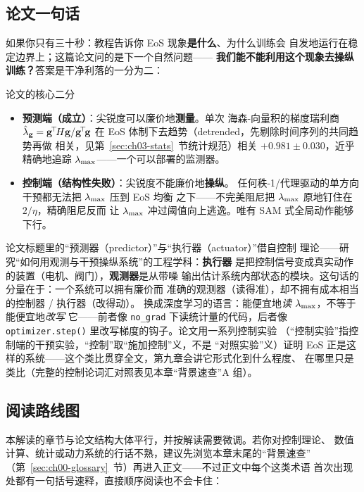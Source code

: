 \subsection{论文一句话}

如果你只有三十秒：教程告诉你 EoS 现象\textbf{是什么}、为什么训练会
自发地运行在稳定边界上；这篇论文问的是下一个自然问题——
\textbf{我们能不能利用这个现象去操纵训练？}答案是干净利落的一分为二：

\begin{keybox}{论文的核心二分}
\begin{itemize}
  \item \textbf{预测端（成立）}：尖锐度可以廉价地\textbf{测量}。单次
        海森-向量积的梯度瑞利商 $\hat{\lambda}_{\mathbf{g}} =
        \mathbf{g}^{\!\top}\!H\mathbf{g}/\mathbf{g}^{\!\top}\!\mathbf{g}$
        在 EoS 体制下去趋势（detrended，先剔除时间序列的共同趋势再做
        相关，见第~\ref{sec:ch03-stats}~节统计规范）相关 $+0.981\pm0.030$，近乎精确地追踪
        $\lambda_{\max}$——一个可以部署的监测器。
  \item \textbf{控制端（结构性失败）}：尖锐度不能廉价地\textbf{操纵}。
        任何秩-1/代理驱动的单方向干预都无法把 $\lambda_{\max}$ 压到 EoS 均衡
        之下——不完美阻尼把 $\lambda_{\max}$ 原地钉住在 $2/\eta$，精确阻尼反而
        让 $\lambda_{\max}$ 冲过阈值向上逃逸。唯有 SAM 式全局动作能够下行。
\end{itemize}
\end{keybox}

论文标题里的``预测器（predictor）''与``执行器（actuator）''借自控制
理论——研究``如何用观测与干预操纵系统''的工程学科：\textbf{执行器}
是把控制信号变成真实动作的装置（电机、阀门），\textbf{观测器}是从带噪
输出估计系统内部状态的模块。这句话的分量在于：一个系统可以拥有廉价而
准确的观测器（读得准），却不拥有成本相当的控制器 / 执行器（改得动）。
换成深度学习的语言：能便宜地\emph{读} $\lambda_{\max}$，不等于能便宜地\emph{改写}
它——前者像 \texttt{no\_grad} 下读统计量的代码，后者像
\texttt{optimizer.step()} 里改写梯度的钩子。论文用一系列控制实验
（``控制实验''指控制端的干预实验，``控制''取``施加控制''义，不是
``对照实验''义）证明
EoS 正是这样的系统——这个类比贯穿全文，第九章会讲它形式化到什么程度、
在哪里只是类比（完整的控制论词汇对照表见本章``背景速查''A 组）。

\subsection{阅读路线图}

本解读的章节与论文结构大体平行，并按解读需要微调。若你对控制理论、
数值计算、统计或动力系统的行话不熟，建议先浏览本章末尾的``背景速查''
（第~\ref{sec:ch00-glossary}~节）再进入正文——不过正文中每个这类术语
首次出现处都有一句括号速释，直接顺序阅读也不会卡住：

